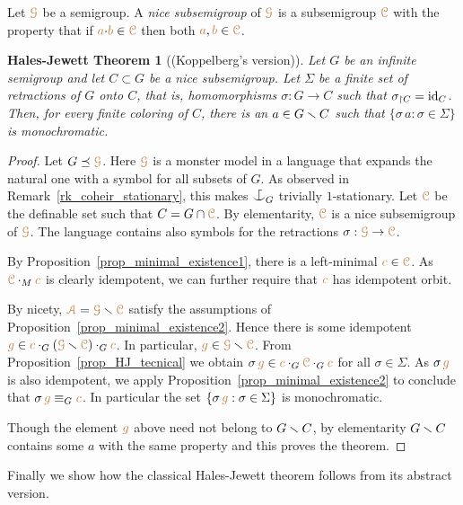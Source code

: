 \documentclass[creche.tex]{subfiles}
\begin{document}
Let ${\color{brown}\EuScript G}$ be a semigroup.
A \emph{nice subsemigroup\/} of ${\color{brown}\EuScript G}$ is a subsemigroup ${\color{brown}\EuScript C}$ with the property that if ${\color{brown} a}{\cdot}{\color{brown} b}\in{\color{brown}\EuScript C}$ then both ${\color{brown} a},{\color{brown} b}\in {\color{brown}\EuScript C}$.


\theoremstyle{mio}
\newtheorem{HalesJewett}[thm]{Hales-Jewett Theorem}
\begin{HalesJewett}[(Koppelberg's version)]\label{thm_abstract_HJ}
Let $G$ be an infinite semigroup and let $C\subset G$ be a nice subsemigroup.
Let $\Sigma$ be a finite set of retractions of $G$ onto $C$, that is, 
homomorphisms $\sigma:G\to C$ such that $\sigma_{\restriction C}={\rm id}_C$.
Then, for every finite coloring of $C$,
there is an $a\in G\smallsetminus C$ such that $\{\sigma\,a:\sigma\in\Sigma\}$ is monochromatic.
\end{HalesJewett}

\begin{proof}
Let $G\preceq{\color{brown}\EuScript G}$.
Here ${\color{brown}\EuScript G}$ is a monster model in a language that expands the natural one with a symbol for all subsets of $G$.
As observed in Remark~\ref{rk_coheir_stationary}, 
this makes $\nonforkc_G$ trivially $1$-stationary.
Let ${\color{brown}\EuScript C}$ be the definable set such that $C=G\cap{\color{brown}\EuScript C}$.
By elementarity, ${\color{brown}\EuScript C}$ is a nice subsemigroup of ${\color{brown}\EuScript G}$.
The language contains also symbols for 
the retractions $\sigma:{\color{brown}\EuScript G}\to{\color{brown}\EuScript C}$.

By Proposition~\ref{prop_minimal_existence1}, there is a left-minimal ${\color{brown} c}\in{\color{brown}\EuScript C}$.
As ${\color{brown}\EuScript C}\cdot_M{\color{brown} c}$ is clearly idempotent, we can further require that ${\color{brown} c}$ has idempotent orbit.

By nicety, ${\color{brown}{\EuScript A}}={\color{brown}\EuScript G}\smallsetminus{\color{brown}\EuScript C}$ satisfy the assumptions of Proposition~\ref{prop_minimal_existence2}.
Hence there is some idempotent ${\color{brown} g}\in{\color{brown}c}\cdot_G({\color{brown}\EuScript G}\smallsetminus{\color{brown}\EuScript C})\cdot_G{\color{brown} c}$.
In particular, ${\color{brown} g}\in{\color{brown}\EuScript G}\smallsetminus{\color{brown}\EuScript C}$.
From Proposition~\ref{prop_HJ_tecnical} we obtain
$\sigma\,{\color{brown} g}\in{\color{brown}c}\cdot_G{\color{brown}\EuScript C}\cdot_G{\color{brown} c}$
for all $\sigma\in\Sigma$.
As $\sigma\,{\color{brown} g}$ is also idempotent, 
we apply Proposition~\ref{prop_minimal_existence2} to conclude that 
$\sigma\,{\color{brown} g}\equiv_G{\color{brown} c}$.
In particular the set $\{\sigma\,{\color{brown} g}:\sigma\in\Sigma\}$ is monochromatic.

Though the element ${\color{brown} g}$ above need not belong to $G\smallsetminus C$,
by elementarity $G\smallsetminus C$ contains some $a$ with the same property and this proves the theorem.
\end{proof}

Finally we show how the classical Hales-Jewett theorem follows from its abstract version.
\end{document}
